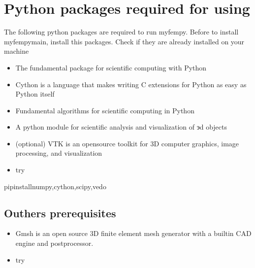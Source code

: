 \documentclass[letterpaper,10pt,english]{sphinxmanual}
\begin{document}
\section{Python packages required for using }
\label{\detokenize{index:python-packages-required-for-using-myfempy}}
\sphinxAtStartPar
The following python packages are required to run myfempy. Before to
install myfempy\sphinxhyphen{}main, install this packages. Check if they are already
installed on your machine
\begin{itemize}
\item {} 
\sphinxAtStartPar
{} \sphinxhyphen{} The fundamental package for
scientific computing with Python

\item {} 
\sphinxAtStartPar
{} \sphinxhyphen{} Cython is a language that makes
writing C extensions for Python as easy as Python itself

\item {} 
\sphinxAtStartPar
{} \sphinxhyphen{} Fundamental algorithms for
scientific computing in Python

\item {} 
\sphinxAtStartPar
{} \sphinxhyphen{} A python module for scientific
analysis and visualization of эd objects

\item {} 
\sphinxAtStartPar
{}(optional) \sphinxhyphen{} VTK is an
open\sphinxhyphen{}source toolkit for 3D computer graphics, image processing, and
visualization

\item {} 
\sphinxAtStartPar
try

\end{itemize}

\begin{sphinxVerbatim}[commandchars=\\\{\}]
\PYGZgt{}\PYGZgt{}pipinstallnumpy,cython,scipy,vedo
\end{sphinxVerbatim}


\subsection{Outhers prerequisites}
\label{\detokenize{index:outhers-prerequisites}}\begin{itemize}
\item {} 
\sphinxAtStartPar
{} \sphinxhyphen{} Gmsh is an
open source 3D finite element mesh generator with a built\sphinxhyphen{}in CAD
engine and post\sphinxhyphen{}processor. 

\item {} 
\sphinxAtStartPar
try

\end{itemize}
\end{document}
